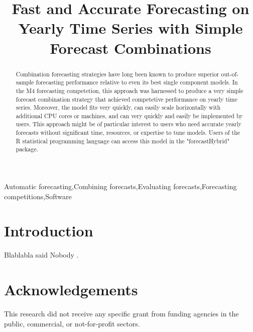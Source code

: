 \documentclass[11pt,3p,review,authoryear]{elsarticle}
\begin{document}
\begin{frontmatter}

\title{Fast and Accurate Forecasting on Yearly Time Series with Simple Forecast Combinations}





\begin{abstract}
Combination forecasting strategies have long been known to produce superior out-of-sample forecasting performance relative to even its best single component models. In the M4 forecasting competetion, this approach was harnessed to produce a very simple forecast combination strategy that achieved competetive performance on yearly time series. Moreover, the model fits very quickly, can easily scale horizontally with additional CPU cores or machines, and can very quickly and easily be implemented by users. This approach might be of particular interest to users who need accurate yearly forecasts without significant time, resources, or expertise to tune models. Users of the R statistical programming language can access this model in the "forecastHybrid" package.
\end{abstract}

\begin{keyword}
Automatic forecasting\sep Combining forecasts\sep Evaluating forecasts\sep Forecasting competitions\sep Software
\end{keyword}

\end{frontmatter}


\section{Introduction}

Blablabla said Nobody \citep{HA14}.

\section*{Acknowledgements}

This research did not receive any specific grant from funding agencies in the public, commercial, or not-for-profit sectors.



\end{document}
